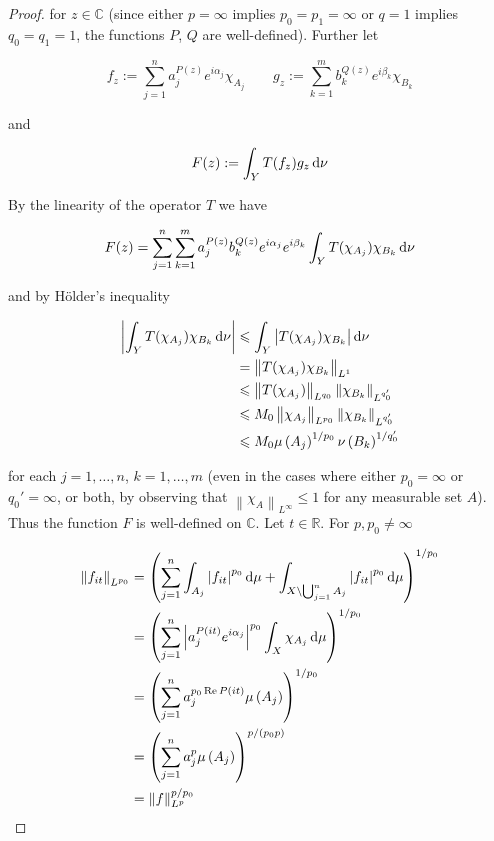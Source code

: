 \begin{proof}
for $z \in \mathbb{C}$ (since either $p = \infty$ implies $p_0 = p_1 = \infty$ or $q = 1$ implies $q_0 = q_1 = 1$, the functions $P$, $Q$ are well-defined). Further let
				
\begin{equation}
	f_z := \sum_{j = 1}^n a^{P(z)}_j e^{i\alpha_j}\chi_{A_j} \qquad g_z :=  \sum_{k = 1}^m b^{Q(z)}_k e^{i\beta_k}\chi_{B_k}
	\label{def:fzgz}
\end{equation}
				
and 

\begin{equation}
	F(z) := \int_Y T(f_z)g_z\mathop{}\!\mathrm{d}\nu
	\label{eq:def_F}
\end{equation}

By the linearity of the operator $T$ we have

\begin{gather*}
	F(z) = \sum_{j = 1}^n\sum_{k = 1}^m a^{P(z)}_j b_k^{Q(z)} e^{i\alpha_j} e^{i\beta_k} \int_YT(\chi_{A_j})\chi_{B_k}\mathop{}\!\mathrm{d}\nu
\end{gather*}

and by H\"older's inequality

\begin{gather}
	\begin{aligned}
		\left| \int_YT(\chi_{A_j})\chi_{B_k}\mathop{}\!\mathrm{d}\nu \right| &\leqslant \int_Y\left| T(\chi_{A_j})\chi_{B_k}\right|\mathop{}\!\mathrm{d}\nu\\
		&= \left\|T(\chi_{A_j})\chi_{B_k}\right\|_{L^1}\\
		&\leqslant \left\|T(\chi_{A_j})\right\|_{L^{q_0}} \left\|\chi_{B_k}\right\|_{L^{q_0'}}\\
		&\leqslant M_0\left\|\chi_{A_j}\right\|_{L^{p_0}} \left\|\chi_{B_k}\right\|_{L^{q_0'}}\\
		&\leqslant M_0 \mu\left(A_j\right)^{1/p_0}\nu\left(B_k\right)^{1/q_0'}
	\end{aligned}
	\label{est:constant_F}
\end{gather}

for each $j = 1,\hdots,n$, $k = 1,\hdots,m$ (even in the cases where either $p_0 = \infty$ or $q_0' = \infty$, or both, by observing that $\left\| \chi_{A}\right\|_{L^\infty} \leqslant 1$ for any measurable set $A$). Thus the function $F$ is well-defined on $\mathbb{C}$. Let $t \in \mathbb{R}$. For $p,p_0 \neq \infty$

\begin{gather*}
	\begin{aligned}
		\left\|f_{it}\right\|_{L^{p_0}} &= \left(\sum_{j = 1}^n \int_{A_j} \left| f_{it} \right|^{p_0} \mathop{}\!\mathrm{d}\mu + \int_{X \setminus \bigcup_{j = 1}^n A_j} \left| f_{it} \right|^{p_0} \mathop{}\!\mathrm{d}\mu\right)^{1/p_0}\\
		&= \left(\sum_{j = 1}^n \left| a_j^{P(it)} e^{i\alpha_j}\right|^{p_0}\int_X \chi_{A_j} \mathop{}\!\mathrm{d}\mu\right)^{1/p_0}\\
		&= \left(\sum_{j = 1}^n a_j^{p_0\operatorname{Re} P(it)}\mu\left(A_j\right)\right)^{1/p_0}\\
		&= \left(\sum_{j = 1}^n a_j^p\mu\left(A_j\right)\right)^{p/\left(p_0p\right)}\\
		&= \left\|f\right\|_{L^p}^{p/p_0} 
	\end{aligned}
\end{gather*}


\end{proof}
